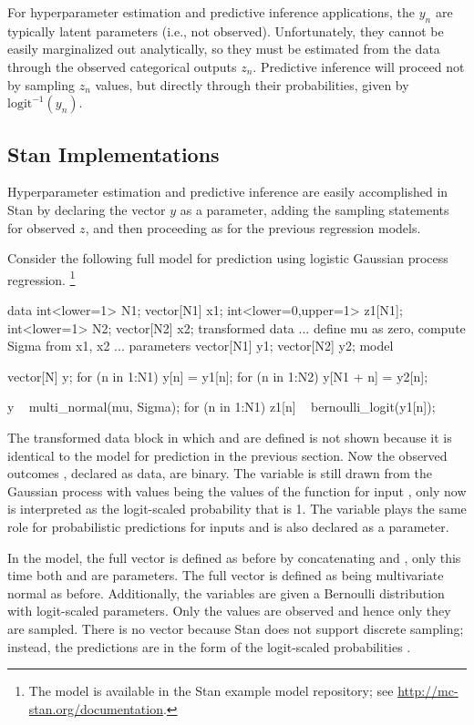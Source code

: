 For hyperparameter estimation and predictive inference applications,
the $y_n$ are typically latent parameters (i.e., not observed).
Unfortunately, they cannot be easily marginalized out analytically,
so they must be estimated from the data through the observed
categorical outputs $z_n$.  Predictive inference will proceed not by
sampling $z_n$ values, but directly through their probabilities, given
by $\mbox{logit}^{-1}(y_n)$.

\subsection{Stan Implementations}

Hyperparameter estimation and predictive inference are easily
accomplished in Stan by declaring the vector $y$ as a parameter,
adding the sampling statements for observed $z$, and then proceeding 
as for the previous regression models.  

Consider the following full model for prediction using logistic Gaussian
process regression.
%
\footnote{The model is available in the Stan example model repository;
see \url{http://mc-stan.org/documentation}.}
%
\begin{stancode}
data {
  int<lower=1> N1;     
  vector[N1] x1; 
  int<lower=0,upper=1> z1[N1];
  int<lower=1> N2;
  vector[N2] x2;
}
transformed data {
 ... define mu as zero, compute Sigma from x1, x2 ...
}
parameters {
  vector[N1] y1;
  vector[N2] y2;
}
model {
  vector[N] y;
  for (n in 1:N1) y[n] = y1[n];
  for (n in 1:N2) y[N1 + n] = y2[n];

  y ~ multi_normal(mu, Sigma);
  for (n in 1:N1)
    z1[n] ~ bernoulli_logit(y1[n]);
}
\end{stancode}
%
The transformed data block in which  and  are
defined is not shown because it is identical to the model for
prediction in the previous section.  Now the observed outcomes
, declared as data, are binary.  The variable  is
still drawn from the Gaussian process with values  being
the values of the function for input , only now
 is interpreted as the logit-scaled probability that
 is 1.  The variable  plays the same role for
probabilistic predictions for inputs  and is also declared as
a parameter.

In the model, the full vector  is defined as before by
concatenating  and , only this time both 
and  are parameters.  The full vector  is defined as
being multivariate normal as before.  Additionally, the 
variables are given a Bernoulli distribution with logit-scaled
parameters.  Only the  values are observed and hence only
they are sampled.  There is no  vector because Stan does
not support discrete sampling; instead, the predictions are in the
form of the logit-scaled probabilities .

